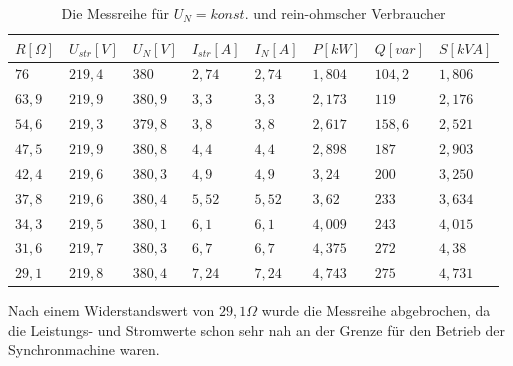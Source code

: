 \documentclass{report}
\begin{document}
\begin{table}[!ht]
	\centering
	\begin{tabular}{llllllll}
		\hline
		$R [\Omega]$ & $U_{str} [V]$ & $U_{N} [V]$ & $I_{str} [A]$ & $I_{N} [A]$ & $P [kW]$ & $Q [var]$ & $S [kVA]$ \\ \hline
		$76$         & $219,4$       & $380$       & $2,74$        & $2,74$      & $1,804$  & $104,2$   & $1,806$   \\
		$63,9$       & $219,9$       & $380,9$     & $3,3$         & $3,3$       & $2,173$  & $119$     & $2,176$   \\
		$54,6$       & $219,3$       & $379,8$     & $3,8$         & $3,8$       & $2,617$  & $158,6$   & $2,521$   \\
		$47,5$       & $219,9$       & $380,8$     & $4,4$         & $4,4$       & $2,898$  & $187$     & $2,903$   \\
		$42,4$       & $219,6$       & $380,3$     & $4,9$         & $4,9$       & $3,24$   & $200$     & $3,250$   \\
		$37,8$       & $219,6$       & $380,4$     & $5,52$        & $5,52$      & $3,62$   & $233$     & $3,634$   \\
		$34,3$       & $219,5$       & $380,1$     & $6,1$         & $6,1$       & $4,009$  & $243$     & $4,015$   \\
		$31,6$       & $219,7$       & $380,3$     & $6,7$         & $6,7$       & $4,375$  & $272$     & $4,38$    \\
		$29,1$       & $219,8$       & $380,4$     & $7,24$        & $7,24$      & $4,743$  & $275$     & $4,731$   \\ \hline
	\end{tabular}
	\caption{Die Messreihe für $U_{N} = konst.$ und rein-ohmscher Verbraucher}
	\label{tab:ohm_messreihe_1}
\end{table}

Nach einem Widerstandswert von $29,1\Omega$ wurde die Messreihe abgebrochen, da die Leistungs- und Stromwerte schon sehr nah an der Grenze für den Betrieb der Synchronmachine waren.
\end{document}
